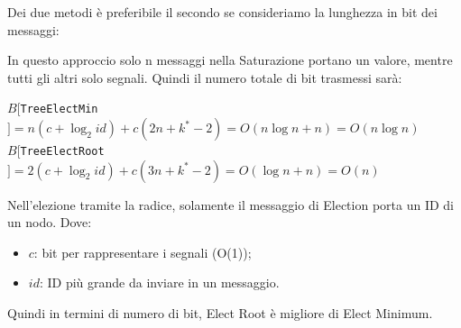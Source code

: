 Dei due metodi è preferibile il secondo se consideriamo la lunghezza in bit dei messaggi:

In questo approccio solo n messaggi nella Saturazione portano un valore, mentre tutti gli altri solo segnali. Quindi il numero totale di bit trasmessi sarà:
\begin{center}
  $B[$\texttt{TreeElectMin}$] = n (c + \log_2 id) + c (2n + k^* - 2) = O(n \log n + n) = O(n \log n)$\\
  $B[$\texttt{TreeElectRoot}$] = 2(c + \log_2 id) + c(3n + k^* - 2) = O(\log n + n) = O(n)$
\end{center}
Nell'elezione tramite la radice, solamente il messaggio di Election porta un ID di un nodo.
Dove:
\begin{itemize}
  \item $c$: bit per rappresentare i segnali (O(1));
  \item $id$: ID più grande da inviare in un messaggio.
\end{itemize}
Quindi in termini di numero di bit, Elect Root è migliore di Elect Minimum.
